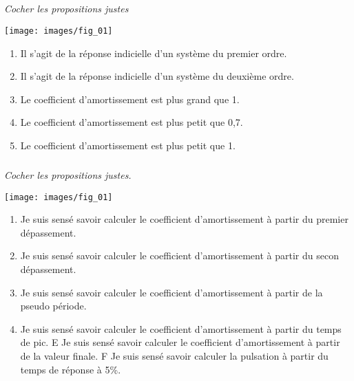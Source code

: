 \documentclass[10pt,fleqn]{article} %
\begin{document}
\def\pathfig{images}

\vspace{6cm}
\pagestyle{fancy}
\thispagestyle{plain}

\def\columnseprulecolor{\color{ocre}}
\setlength{\columnseprule}{0.4pt} 

\def\pathfig{images}

\begin{multicols}{2}



\subparagraph{}\textit{Cocher les propositions justes}

\begin{center}
\texttt{[image: images/fig\_01]}
\end{center}


\begin{enumerate}
\item Il s'agit de la réponse indicielle d'un système du premier ordre.
\item Il s'agit de la réponse indicielle d'un système du deuxième ordre.
\item Le coefficient d'amortissement est plus grand que 1.
\item Le coefficient d'amortissement est plus petit que 0,7.
\item Le coefficient d'amortissement est plus petit que 1.
\end{enumerate}

\subparagraph{}\textit{Cocher les propositions justes.}
\begin{center}
\texttt{[image: images/fig\_01]}
\end{center}

\begin{enumerate}
\item Je suis sensé savoir calculer le coefficient d'amortissement à partir du
premier dépassement.
\item Je suis sensé savoir calculer le coefficient d'amortissement à partir du
secon dépassement.
\item Je suis sensé savoir calculer le coefficient d'amortissement à partir de la pseudo période.
\item Je suis sensé savoir calculer le coefficient d'amortissement à partir du temps de pic.
E Je suis sensé savoir calculer le coefficient d'amortissement à partir de la valeur finale.
F Je suis sensé savoir calculer la pulsation à partir du temps de réponse à 5\%.
\end{enumerate}



\end{multicols}
\end{document}

